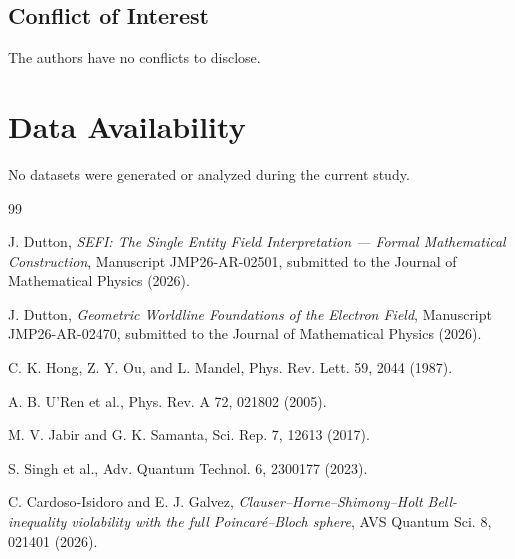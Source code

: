 \documentclass[aip, adv, reprint, superscriptaddress]{revtex4-2}
\begin{document}
\subsection*{Conflict of Interest}
The authors have no conflicts to disclose.

\section*{Data Availability}
No datasets were generated or analyzed during the current study.



\begin{thebibliography}{99}

J. Dutton, \textit{SEFI: The Single Entity Field Interpretation --- Formal Mathematical Construction}, 
Manuscript JMP26-AR-02501, submitted to the Journal of Mathematical Physics (2026).

J. Dutton, \textit{Geometric Worldline Foundations of the Electron Field}, 
Manuscript JMP26-AR-02470, submitted to the Journal of Mathematical Physics (2026).

C. K. Hong, Z. Y. Ou, and L. Mandel, Phys. Rev. Lett. 59, 2044 (1987).

A. B. U'Ren et al., Phys. Rev. A 72, 021802 (2005).

M. V. Jabir and G. K. Samanta, Sci. Rep. 7, 12613 (2017).

S. Singh et al., Adv. Quantum Technol. 6, 2300177 (2023).

C. Cardoso-Isidoro and E. J. Galvez, 
\textit{Clauser–Horne–Shimony–Holt Bell-inequality violability with the full Poincaré–Bloch sphere}, 
AVS Quantum Sci. 8, 021401 (2026).

\end{thebibliography}
\end{document}
